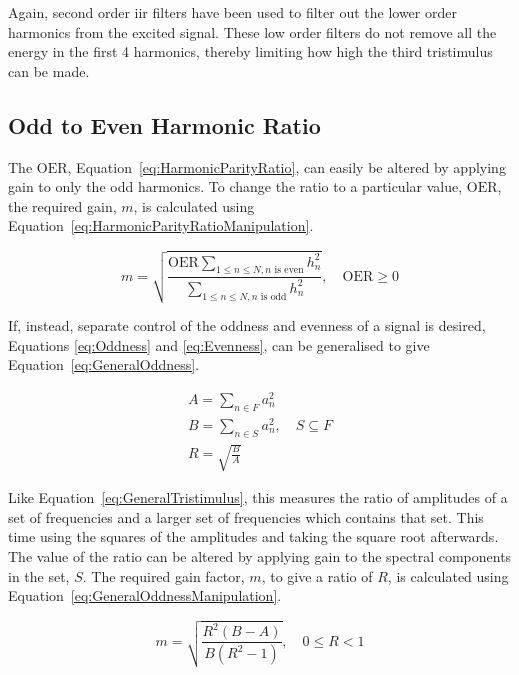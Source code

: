 		Again, second order \acrshort{iir} filters have been used to filter out the lower order harmonics from the
		excited signal.	These low order filters do not remove all the energy in the first 4 harmonics, thereby
		limiting how high the third tristimulus can be made.

	\subsection{Odd to Even Harmonic Ratio}
	\label{sec:FeatureControl-Parameterisation-HarmonicParityRatio}
		The $\mathrm{OER}$, Equation~\ref{eq:HarmonicParityRatio}, can easily be altered by applying gain to only
		the odd harmonics. To change the ratio to a particular value, $\mathrm{OER}$, the required gain, $m$, is
		calculated using Equation~\ref{eq:HarmonicParityRatioManipulation}.

		\begin{equation}
			m = \sqrt{\frac{\mathrm{OER}\sum_{1 \leq n \leq N, n \text{ is even}} h_{n}^{2}}
				       {\sum_{1 \leq n \leq N, n \text{ is odd}} h_{n}^{2}}},
				       \quad \mathrm{OER} \geq 0
		       \label{eq:HarmonicParityRatioManipulation}
		\end{equation}

		If, instead, separate control of the oddness and evenness of a signal is desired, Equations
		\ref{eq:Oddness} and \ref{eq:Evenness}, can be generalised to give Equation~\ref{eq:GeneralOddness}.

		\begin{gather}
			A = \sum_{n \in F} a_{n}^{2} \nonumber \\
			B = \sum_{n \in S} a_{n}^{2}, \quad S \subseteq F \nonumber \\
			R = \sqrt{\frac{B}{A}}
			\label{eq:GeneralOddness}
		\end{gather}

		Like Equation~\ref{eq:GeneralTristimulus}, this measures the ratio of amplitudes of a set of frequencies
		and a larger set of frequencies which contains that set. This time using the squares of the amplitudes and
		taking the square root afterwards. The value of the ratio can be altered by applying gain to the spectral
		components in the set, $S$. The required gain factor, $m$, to give a ratio of $R$, is calculated using
		Equation~\ref{eq:GeneralOddnessManipulation}.

		\begin{equation}
			m = \sqrt{\frac{R^{2}(B - A)}{B(R^{2} - 1)}}, \quad 0 \leq R < 1
			\label{eq:GeneralOddnessManipulation}
		\end{equation}

